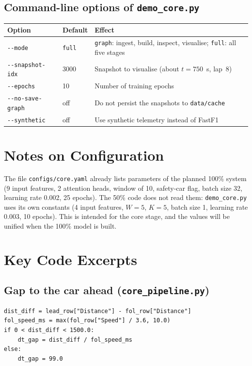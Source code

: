 \documentclass[11pt,a4paper]{article}
\begin{document}
\subsection*{Command-line options of \texttt{demo\_core.py}}
\begin{table}[H]
\centering
\small
\begin{tabularx}{\linewidth}{@{}llX@{}}
\toprule
\textbf{Option} & \textbf{Default} & \textbf{Effect} \\
\midrule
\texttt{-{}-mode} & \texttt{full} & \texttt{graph}: ingest, build, inspect, visualise; \texttt{full}: all five stages \\
\texttt{-{}-snapshot-idx} & 3000 & Snapshot to visualise (about $t=750$~s, lap~8) \\
\texttt{-{}-epochs} & 10 & Number of training epochs \\
\texttt{-{}-no-save-graph} & off & Do not persist the snapshots to \texttt{data/cache} \\
\texttt{-{}-synthetic} & off & Use synthetic telemetry instead of FastF1 \\
\bottomrule
\end{tabularx}
\end{table}

\section{Notes on Configuration}
The file \texttt{configs/core.yaml} already lists parameters of the
planned 100\% system (9 input features, 2 attention heads, window of 10,
safety-car flag, batch size 32, learning rate 0.002, 25 epochs). The 50\%
code does not read them: \texttt{demo\_core.py} uses its own constants
(4 input features, $W=5$, $K=5$, batch size 1, learning rate 0.003,
10 epochs). This is intended for the core stage, and the values will be
unified when the 100\% model is built.

\section{Key Code Excerpts}
\label{app:code}
\subsection*{Gap to the car ahead (\texttt{core\_pipeline.py})}
\begin{lstlisting}
dist_diff = lead_row["Distance"] - fol_row["Distance"]
fol_speed_ms = max(fol_row["Speed"] / 3.6, 10.0)
if 0 < dist_diff < 1500.0:
    dt_gap = dist_diff / fol_speed_ms
else:
    dt_gap = 99.0
\end{lstlisting}
\end{document}
